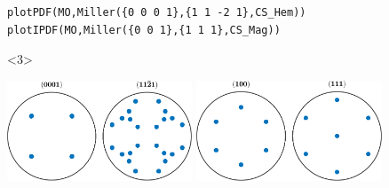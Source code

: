 \documentclass[compress]{beamer}
\begin{document}
\begin{frame}[fragile]
\begin{overlayarea}{\textwidth}{8cm}
  \pause

\vspace{-0.3cm}
\begin{lstlisting}[style=input]
plotPDF(MO,Miller({0 0 0 1},{1 1 -2 1},CS_Hem))
plotIPDF(MO,Miller({0 0 1},{1 1 1},CS_Mag))
\end{lstlisting}

\vspace{-0.5cm}

\begin{onlyenv}<3>
  \begin{center}
    \includegraphics[height=3cm]{pic/HemPDF111.pdf}
    \quad
    \includegraphics[height=3cm]{pic/MagPDF110.pdf}
  \end{center}
\end{onlyenv}

\end{overlayarea}
\end{frame}
\end{document}
